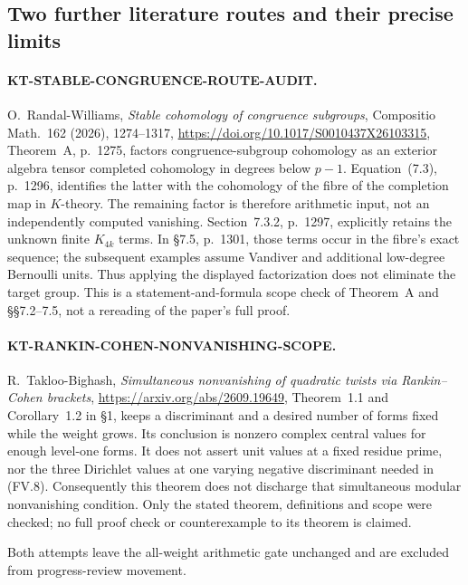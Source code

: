 \subsection{Two further literature routes and their precise limits}

\paragraph{KT-STABLE-CONGRUENCE-ROUTE-AUDIT.}
O.~Randal-Williams, \emph{Stable cohomology of congruence
subgroups}, Compositio Math.~162 (2026), 1274--1317,
\url{https://doi.org/10.1017/S0010437X26103315},
Theorem~A, p.~1275, factors congruence-subgroup cohomology
as an exterior algebra tensor completed cohomology in
degrees below $p-1$. Equation~(7.3), p.~1296, identifies
the latter with the cohomology of the fibre of the
completion map in $K$-theory. The remaining factor is
therefore arithmetic input, not an independently computed
vanishing. Section~7.3.2, p.~1297, explicitly retains the
unknown finite $K_{4k}$ terms. In \S7.5, p.~1301, those
terms occur in the fibre's exact sequence; the subsequent
examples assume Vandiver and additional low-degree
Bernoulli units. Thus applying the displayed factorization
does not eliminate the target group. This is a
statement-and-formula scope check of Theorem~A and
\S\S7.2--7.5, not a rereading of the paper's full proof.

\paragraph{KT-RANKIN-COHEN-NONVANISHING-SCOPE.}
R.~Takloo-Bighash, \emph{Simultaneous nonvanishing of
quadratic twists via Rankin--Cohen brackets},
\url{https://arxiv.org/abs/2609.19649}, Theorem~1.1 and
Corollary~1.2 in \S1, keeps a discriminant and a desired
number of forms fixed while the weight grows. Its
conclusion is nonzero complex central values for enough
level-one forms. It does not assert unit values at a
fixed residue prime, nor the three Dirichlet values at
one varying negative discriminant needed in (FV.8).
Consequently this theorem does not discharge that
simultaneous modular nonvanishing condition. Only the
stated theorem, definitions and scope were checked;
no full proof check or counterexample to its theorem
is claimed.

Both attempts leave the all-weight arithmetic gate
unchanged and are excluded from progress-review movement.
